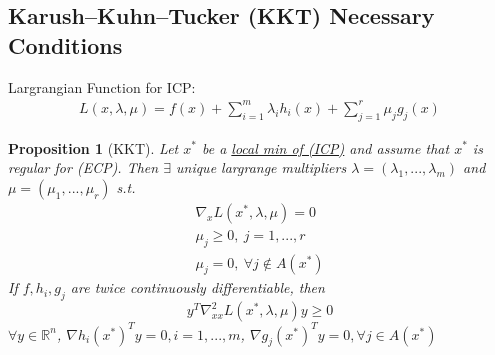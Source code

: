 \documentclass[11pt,a4paper]{article}
\newtheorem{proposition}{Proposition}
\begin{document}
\subsection{Karush–Kuhn–Tucker (KKT) Necessary Conditions}
Largrangian Function for ICP:
\begin{equation}
    \begin{aligned}
        L(x,\lambda,\mu)=f(x)+\sum_{i=1}^m\lambda_i h_i(x)+\sum_{j=1}^r\mu_j g_j(x)
    \end{aligned}
    \nonumber
\end{equation}
\begin{proposition}[KKT]
    Let $x^*$ be a \underline{local min of (ICP)} and assume that $x^*$ is regular for (ECP). Then $\exists$ unique largrange multipliers $\lambda=(\lambda_1,...,\lambda_m)$ and $\mu=(\mu_1,...,\mu_r)$ s.t.
    \begin{equation}
        \begin{aligned}
            \nabla_xL(x^*,\lambda,\mu)=0\\
            \mu_j\geq 0,\ j=1,...,r\\
            \mu_j=0,\ \forall j\notin A(x^*)
        \end{aligned}
        \nonumber
    \end{equation}
If $f,h_i,g_j$ are twice continuously differentiable, then $$y^T \nabla^2_{xx}L(x^*,\lambda,\mu)y\geq 0$$
$\forall y\in \mathbb{R}^n$, $\nabla h_i(x^*)^Ty=0,i=1,...,m$, $\nabla g_j(x^*)^Ty=0,\forall j\in A(x^*)$
\end{proposition}
\end{document}
